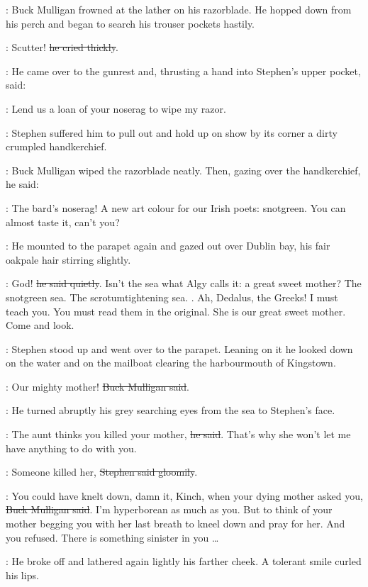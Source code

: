 :
Buck Mulligan frowned at the lather on his razorblade.
He hopped down from his perch
and began to search his trouser pockets hastily.

\Mulligan:
Scutter!
\sout{he cried thickly}.

:
He came over to the gunrest
and, thrusting a hand into Stephen's upper pocket,
said:

\Mulligan:
Lend us a loan of your noserag to wipe my razor.

:
Stephen suffered him to pull out
and hold up on show by its corner
a dirty crumpled handkerchief.

:
Buck Mulligan wiped the razorblade neatly.
Then, gazing over the handkerchief, he said:

\Mulligan:
The bard's noserag!
A new art colour for our Irish poets:
snotgreen.
You can almost taste it, can't you?

:
He mounted to the parapet again
and gazed out over Dublin bay,
his fair oakpale hair stirring slightly.

\Mulligan:
God!
\sout{he said quietly}.
Isn't the sea what Algy calls it:
a great sweet mother?
The snotgreen sea.
The scrotumtightening sea.
.
Ah, Dedalus, the Greeks!
I must teach you.
You must read them in the original.
She is our great sweet mother.
Come and look.

:
Stephen stood up and went over to the parapet.
Leaning on it
he looked down on the water
and on the mailboat clearing the harbourmouth of Kingstown.

\Mulligan:
Our mighty mother!
\sout{Buck Mulligan said}.

:
He turned abruptly his grey searching eyes
from the sea to Stephen's face.

\Mulligan:
The aunt thinks you killed your mother,
\sout{he said}.
That's why she won't let me have anything to do with you.

\Stephen:
Someone killed her,
\sout{Stephen said gloomily}.

\Mulligan:
You could have knelt down,
damn it, Kinch,
when your dying mother asked you,
\sout{Buck Mulligan said}.
I'm hyperborean as much as you.
But to think of your mother
begging you with her last breath
to kneel down and pray for her.
And you refused.
There is something sinister in you …

:
He broke off and lathered again lightly his farther cheek.
A tolerant smile curled his lips.

